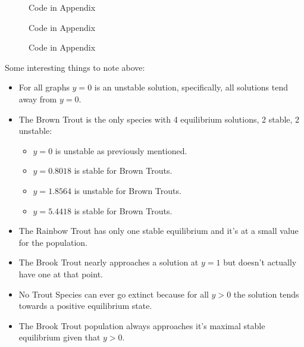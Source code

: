\documentclass[letterpaper,12pt]{article}
\begin{document}
\begin{figure}[H]
    \centering
    
    \caption{Code in Appendix}
    \label{fig:4}
\end{figure}
\begin{figure}[H]
    \centering
    
    \caption{Code in Appendix}
    \label{fig:5}
\end{figure}
\begin{figure}[H]
    \centering
    
    \caption{Code in Appendix}
    \label{fig:6}
\end{figure}
Some interesting things to note above:
\begin{itemize}
    \item For all graphs \(y = 0\) is an unstable solution, specifically, all solutions tend away from \(y = 0\).
    \item The Brown Trout is the only species with 4 equilibrium solutions, 2 stable, 2 unstable:
        \begin{itemize}
            \item \(y = 0\) is unstable as previously mentioned.
            \item \(y = 0.8018\) is stable for Brown Trouts.
            \item \(y = 1.8564\) is unstable for Brown Trouts.
            \item \(y = 5.4418\) is stable for Brown Trouts.
        \end{itemize}
    \item The Rainbow Trout has only one stable equilibrium and it's at a small value for the population.
    \item The Brook Trout nearly approaches a solution at \(y = 1\) but doesn't actually have one at that point.
    \item No Trout Species can ever go extinct because for all \(y > 0\) the solution tends towards a positive equilibrium state.
    \item The Brook Trout population always approaches it's maximal stable equilibrium given that \(y > 0\).
\end{itemize}
\end{document}

